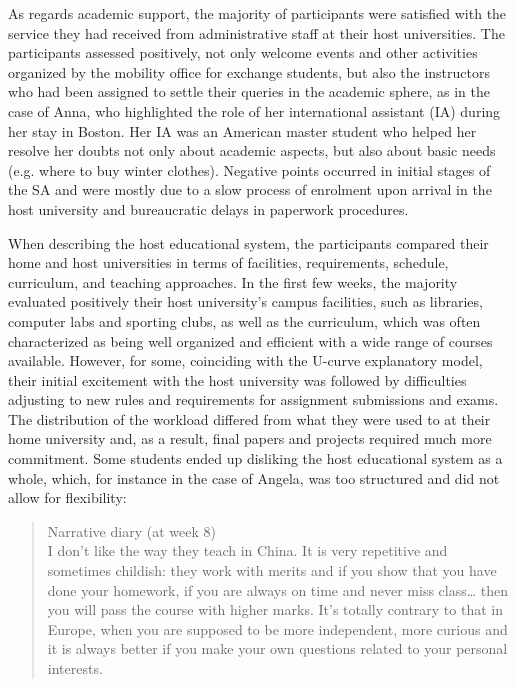 \documentclass[output=paper]{langsci/langscibook}
\begin{document}
As regards academic support, the majority of participants were satisfied with the service they had received from administrative staff at their host universities. The participants assessed positively, not only welcome events and other activities organized by the mobility office for exchange students, but also the instructors who had been assigned to settle their queries in the academic sphere, as in the case of Anna, who highlighted the role of her international assistant (IA) during her stay in Boston. Her IA was an American master student who helped her resolve her doubts not only about academic aspects, but also about basic needs (e.g. where to buy winter clothes). Negative  points occurred in initial stages of the SA and were mostly due to a slow process of enrolment upon arrival in the host university and bureaucratic delays in paperwork procedures.  

When describing the host educational system, the participants compared their home and host universities in terms of facilities, requirements, schedule, curriculum, and teaching approaches. In the first few weeks, the majority evaluated positively their host university’s campus facilities, such as libraries, computer labs and sporting clubs, as well as the curriculum, which was often characterized as being well organized and efficient with a wide range of courses available. However, for some, coinciding with the U-curve explanatory model, their initial excitement with the host university was followed by difficulties adjusting to new rules and requirements for assignment submissions and exams. The distribution of the workload differed from what they were used to at their home university and, as a result, final papers and projects required much more commitment. Some students ended up disliking the host educational system as a whole, which, for instance in the case of Angela, was too structured and did not allow for flexibility:

\begin{quote}
Narrative diary (at week 8)
\smallskip\\
I don’t like the way they teach in China. It is very repetitive and sometimes childish: they work with merits and if you show that you have done your homework, if you are always on time and never miss class… then you will pass the course with higher marks. It’s totally contrary to that in Europe, when you are supposed to be more independent, more curious and it is always better if you make your own questions related to your personal interests.
\end{quote}
\end{document}
